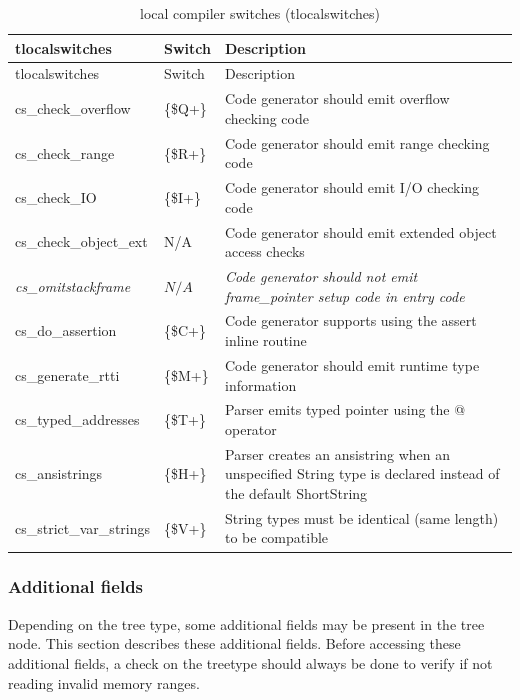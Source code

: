 \documentclass [a4paper,12pt]{article}
\begin{document}
\begin{longtable}{|l|l|p{10cm}|}
\caption{local compiler switches (tlocalswitches)}\label{tlocalswitches}\\
\hline
tlocalswitches & Switch & Description \\
\hline
\endfirsthead
\hline
tlocalswitches & Switch & Description \\
\hline
\endhead
\hline
\endfoot
\textsf{cs{\_}check{\_}overflow}    &  {\{}{\$}Q+{\}}&
    Code generator should emit overflow checking code  \\
\textsf{cs{\_}check{\_}range}       &  {\{}{\$}R+{\}}&
    Code generator should emit range checking code  \\
\textsf{cs{\_}check{\_}IO}      &  {\{}{\$}I+{\}}&
    Code generator should emit I/O checking code \\
\textsf{cs{\_}check{\_}object{\_}ext}   &  N/A&
    Code generator should emit extended object access checks \\
\textsf{\textit{cs{\_}omitstackframe}}  &  $N/A$ &
    \textit{Code generator should not emit frame{\_}pointer setup code
    in entry code} \\
\textsf{cs{\_}do{\_}assertion}      & {\{}{\$}C+{\}} & 
    Code generator supports using the assert inline routine \\
\textsf{cs{\_}generate{\_}rtti}     & {\{}{\$}M+{\}} &
    Code generator should emit runtime type information \\
\textsf{cs{\_}typed{\_}addresses}   & {\{}{\$}T+{\}}&
    Parser emits typed pointer using the @ operator  \\
\textsf{cs{\_}ansistrings}      & {\{}{\$}H+{\}}&
    Parser creates an \textsf{ansistring} when an unspecified
    \textsf{String} type is declared instead of the default
    \textsf{ShortString} \\
\textsf{cs{\_}strict{\_}var{\_}strings} & {\{}{\$}V+{\}}&
    String types must be identical (same length) to be compatible \\
\hline
\end{longtable}

\subsubsection{Additional fields}
\label{subsubsec:additional}

Depending on the tree type, some additional fields may be present in the
tree node. This section describes these additional fields. Before accessing
these additional fields, a check on the \textsf{treetype} should always be
done to verify if not reading invalid memory ranges.
\end{document}
